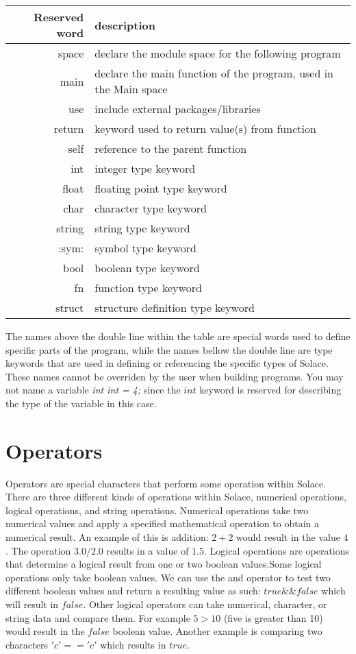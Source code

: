 \documentclass{article}
\begin{document}
\begin{center}
\begin{tabular}{|r|l|}
\hline
Reserved word & description \\
\hline
\hline
space & declare the module space for the following program \\
main & declare the main function of the program, used in the Main space \\
use & include external packages/libraries \\
return & keyword used to return value(s) from function \\
self & reference to the parent function \\
\hline
\hline
int & integer type keyword \\
float & floating point type keyword \\
char & character type keyword \\
string & string type keyword \\
:sym: & symbol type keyword \\
bool & boolean type keyword \\
fn & function type keyword \\
struct & structure definition type keyword \\
\hline
\end{tabular}
\end{center}

The names above the double line within the table are special words used to define specific parts of the program, while the names bellow the double line are type keywords that
are used in defining or referencing the specific types of Solace. These names cannot be overriden by the user when building programs. You may not name a variable
\textit{int int = 4;} since the $int$ keyword is reserved for describing the type of the variable in this case.

\section{Operators}

Operators are special characters that perform some operation within Solace. There are three different kinds of operations within Solace, numerical operations, logical operations,
and string operations. Numerical operations take two numerical values and apply a specified mathematical operation to obtain a numerical result. An example of this is addition:
$2 + 2$ would result in the value $4$. The operation $3.0 / 2.0$ results in a value of $1.5$. Logical operations are operations that determine a logical result from one or two
boolean values.Some logical operations only take boolean values. We can use the and operator to test two different boolean values and return a resulting value as such: $true \&\& false$
which will result in $false$. Other logical operators can take numerical, character, or string data and compare them. For example $5 > 10$ (five is greater than 10) would result in
the $false$ boolean value. Another example is comparing two characters $'c' == 'c'$ which results in $true$.
\end{document}
